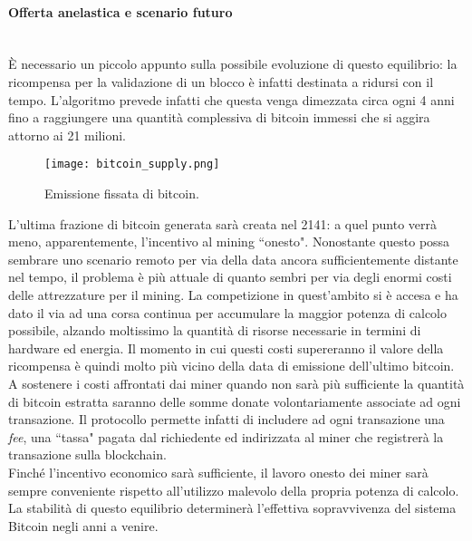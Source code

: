 			\paragraph{Offerta anelastica e scenario futuro} ~ \\
				È necessario un piccolo appunto sulla possibile evoluzione di questo equilibrio: la ricompensa per la validazione di un blocco è infatti destinata a ridursi con il tempo. L'algoritmo prevede infatti che questa venga dimezzata circa ogni 4 anni fino a raggiungere una quantità complessiva di bitcoin immessi che si aggira attorno ai 21 milioni.
				\begin{figure}[ht]
					\centering
					\texttt{[image: bitcoin\_supply.png]}
					\caption[Emissione fissata di bitcoin]{Emissione fissata di bitcoin.}
					\label{fig:bitcoin_supply}
				\end{figure}
				L'ultima frazione di bitcoin generata sarà creata nel 2141: a quel punto verrà meno, apparentemente, l'incentivo al mining ``onesto". Nonostante questo possa sembrare uno scenario remoto per via della data ancora sufficientemente distante nel tempo, il problema è più attuale di quanto sembri per via degli enormi costi delle attrezzature per il mining. La competizione in quest'ambito si è accesa e ha dato il via ad una corsa continua per accumulare la maggior potenza di calcolo possibile, alzando moltissimo la quantità di risorse necessarie in termini di hardware ed energia. Il momento in cui questi costi supereranno il valore della ricompensa è quindi molto più vicino della data di emissione dell'ultimo bitcoin. \\
				A sostenere i costi affrontati dai miner quando non sarà più sufficiente la quantità di bitcoin estratta saranno delle somme donate volontariamente associate ad ogni transazione. Il protocollo permette infatti di includere ad ogni transazione una \emph{fee}, una ``tassa" pagata dal richiedente ed indirizzata al miner che registrerà la transazione sulla blockchain. \\
				Finché l'incentivo economico sarà sufficiente, il lavoro onesto dei miner sarà sempre conveniente rispetto all'utilizzo malevolo della propria potenza di calcolo. La stabilità di questo equilibrio determinerà l'effettiva sopravvivenza del sistema Bitcoin negli anni a venire.